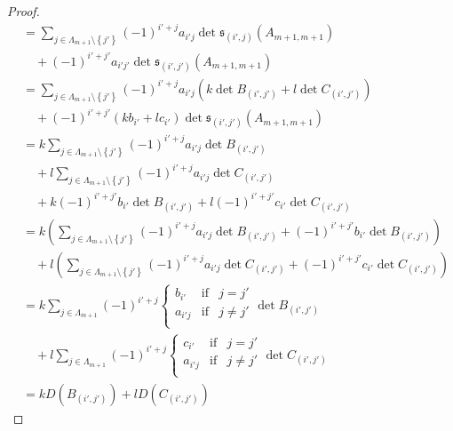 \documentclass[dvipdfmx]{jsarticle}
\begin{document}
\begin{proof}
\begin{align*}
&= \sum_{j \in \varLambda_{m + 1} \setminus \left\{ j' \right\}} {( - 1)^{i' + j}a_{i'j}\det{\mathfrak{s}_{\left( i',j \right)}\left( A_{m + 1,m + 1} \right)}} \\
&\quad + ( - 1)^{i' + j'}a_{i'j'}\det{\mathfrak{s}_{\left( i',j' \right)}\left( A_{m + 1,m + 1} \right)}\\
&= \sum_{j \in \varLambda_{m + 1} \setminus \left\{ j' \right\}} {( - 1)^{i' + j}a_{i'j}\left( k\det B_{\left( i',j' \right)} + l\det C_{\left( i',j' \right)} \right)} \\
&\quad + ( - 1)^{i' + j'}\left( kb_{i'} + lc_{i'} \right)\det{\mathfrak{s}_{\left( i',j' \right)}\left( A_{m + 1,m + 1} \right)}\\
&= k\sum_{j \in \varLambda_{m + 1} \setminus \left\{ j' \right\}} {( - 1)^{i' + j}a_{i'j}\det B_{\left( i',j' \right)}} \\
&\quad + l\sum_{j \in \varLambda_{m + 1} \setminus \left\{ j' \right\}} {( - 1)^{i' + j}a_{i'j}\det C_{\left( i',j' \right)}} \\
&\quad + k( - 1)^{i' + j'}b_{i'}\det B_{\left( i',j' \right)} + l( - 1)^{i' + j'}c_{i'}\det C_{\left( i',j' \right)}\\
&= k\left( \sum_{j \in \varLambda_{m + 1} \setminus \left\{ j' \right\}} {( - 1)^{i' + j}a_{i'j}\det B_{\left( i',j' \right)}} + ( - 1)^{i' + j'}b_{i'}\det B_{\left( i',j' \right)} \right) \\
&\quad + l\left( \sum_{j \in \varLambda_{m + 1} \setminus \left\{ j' \right\}} {( - 1)^{i' + j}a_{i'j}\det C_{\left( i',j' \right)}} + ( - 1)^{i' + j'}c_{i'}\det C_{\left( i',j' \right)} \right)\\
&= k\sum_{j \in \varLambda_{m + 1}}  ( - 1)^{i' + j} \left\{ \begin{matrix}
b_{i'} & \mathrm{if} & j = j' \\
a_{i'j} & \mathrm{if} & j \neq j' \\
\end{matrix} \right. \det B_{\left( i',j' \right)} \\
&\quad + l\sum_{j \in \varLambda_{m + 1}}  {( - 1)^{i' + j}\left\{ \begin{matrix}
c_{i'} & \mathrm{if} & j = j' \\
a_{i'j} & \mathrm{if} & j \neq j' \\
\end{matrix} \right. \det C_{\left( i',j' \right)}}\\
&= kD\left( B_{\left( i',j' \right)} \right) + lD\left( C_{\left( i',j' \right)} \right)
\end{align*}

\end{proof}
\end{document}
